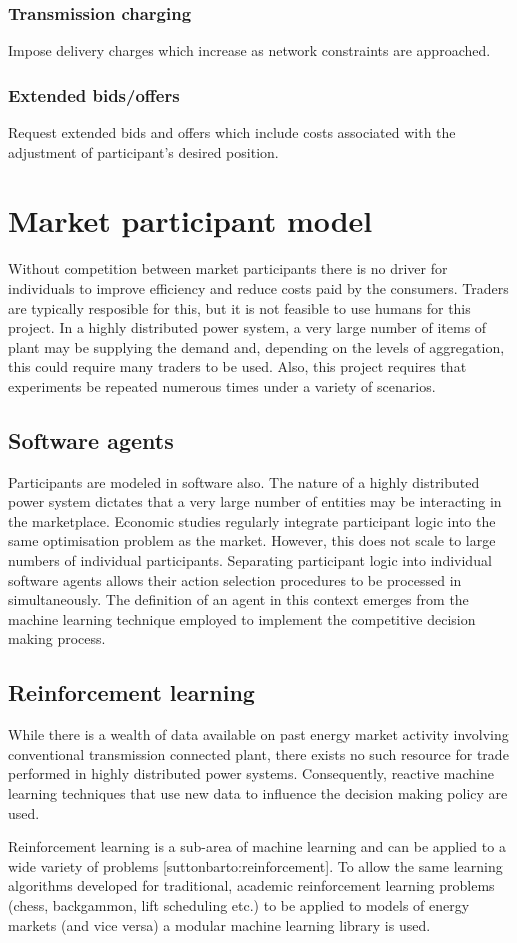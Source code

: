 \subsubsection{Transmission charging}
Impose delivery charges which increase as network constraints are approached.


\subsubsection{Extended bids/offers}
Request extended bids and offers which include costs associated with the
adjustment of participant's desired position.


\section{Market participant model}
Without competition between market participants there is no driver for
individuals to improve efficiency and reduce costs paid by the consumers.
Traders are typically resposible for this, but it is not feasible to use
humans for this project.  In a highly distributed power system, a very large
number of items of plant may be supplying the demand and, depending on the
levels of aggregation, this could require many traders to be used.  Also, this
project requires that experiments be repeated numerous times under a variety
of scenarios.

\subsection{Software agents}
Participants are modeled in software also.  The nature of a highly distributed
power system dictates that a very large number of entities may be interacting
in the marketplace.  Economic studies regularly integrate participant logic
into the same optimisation problem as the market.  However, this does not
scale to large numbers of individual participants.  Separating participant
logic into individual software agents allows their action selection procedures
to be processed in simultaneously.  The definition of an agent in this context
emerges from the machine learning technique employed to implement the
competitive decision making process.

\subsection{Reinforcement learning}
While there is a wealth of data available on past energy market activity
involving conventional transmission connected plant, there exists no such
resource for trade performed in highly distributed power systems.
Consequently, reactive machine learning techniques that use new data to
influence the decision making policy are used.

Reinforcement learning is a sub-area of machine learning and can be applied to
a wide variety of problems [suttonbarto:reinforcement].  To allow the same
learning algorithms developed for traditional, academic reinforcement learning
problems (chess, backgammon, lift scheduling etc.) to be applied to models of
energy markets (and vice versa) a modular machine learning library is used.
